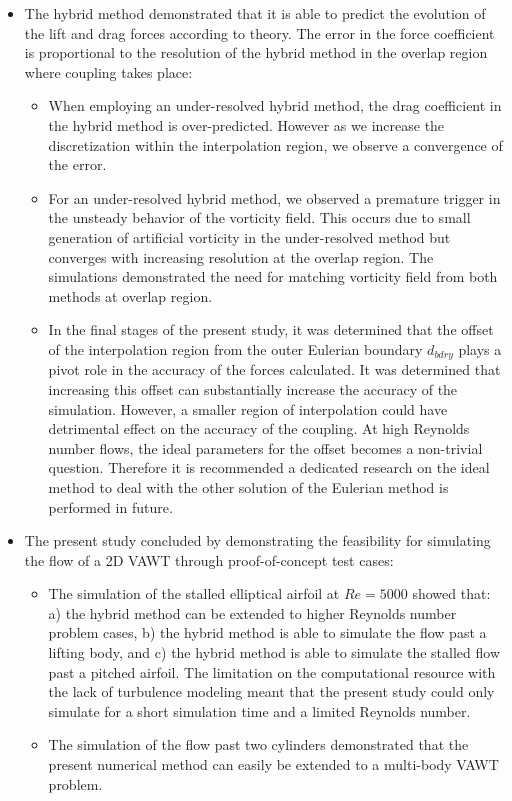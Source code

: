 \begin{itemize}
\item The hybrid method demonstrated that it is able to predict the evolution of the lift and drag forces according to theory. The error in the force coefficient is proportional to the resolution of the hybrid method in the overlap region where coupling takes place:

	\begin{itemize}
	\item When employing an under-resolved hybrid method, the drag coefficient in the hybrid method is over-predicted. However as we increase the discretization within the interpolation region, we observe a convergence of the error.
	\item For an under-resolved hybrid method, we observed a premature trigger in the unsteady behavior of the vorticity field. This occurs due to small generation of artificial vorticity in the under-resolved method but converges with increasing resolution at the overlap region. The simulations demonstrated the need for matching vorticity field from both methods at overlap region.
	\item In the final stages of the present study, it was determined that the offset of the interpolation region from the outer Eulerian boundary $d_{bdry}$ plays a pivot role in the accuracy of the forces calculated. It was determined that increasing this offset can substantially increase the accuracy of the simulation. However, a smaller region of interpolation could have detrimental effect on the accuracy of the coupling. At high Reynolds number flows, the ideal parameters for the offset becomes a non-trivial question. Therefore it is recommended a dedicated research on the ideal method to deal with the other solution of the Eulerian method is performed in future.
	\end{itemize}
	
\item The present study concluded by demonstrating the feasibility for simulating the flow of a 2D VAWT through proof-of-concept test cases:

	\begin{itemize}
	\item The simulation of the stalled elliptical airfoil at $Re=5000$ showed that: a) the hybrid method can be extended to higher Reynolds number problem cases, b) the hybrid method is able to simulate the flow past a lifting body, and c) the hybrid method is able to simulate the stalled flow past a pitched airfoil. The limitation on the computational resource with the lack of turbulence modeling meant that the present study could only simulate for a short simulation time and a limited Reynolds number.
	\item The simulation of the flow past two cylinders demonstrated that the present numerical method can easily be extended to a multi-body VAWT problem.
	\end{itemize}

\end{itemize}


